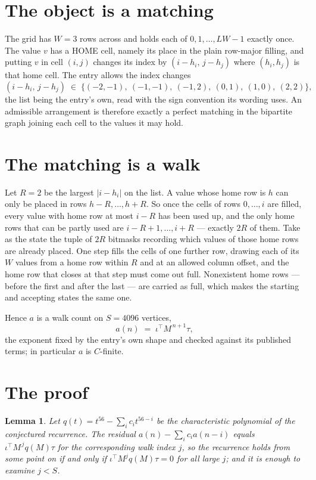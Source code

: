 \documentclass[11pt,a4paper]{article}
\theoremstyle{plain}
\newtheorem{lemma}[theorem]{Lemma}
\theoremstyle{definition}
\begin{document}
\section{The object is a matching}

The grid has $W=3$ rows across and holds each of $0,1,\dots,LW-1$ exactly once. The value
$v$ has a HOME cell, namely its place in the plain row-major filling, and putting $v$ in cell
$(i,j)$ changes its index by $(i-h_i,\,j-h_j)$ where $(h_i,h_j)$ is that home cell. The entry
allows the index changes
\[
(i-h_i,\,j-h_j)\;\in\;\{(-2,-1),\ (-1,-1),\ (-1,2),\ (0,1),\ (1,0),\ (2,2)\},
\]
the list being the entry's own, read with the sign convention its wording uses. An admissible
arrangement is therefore exactly a perfect matching in the bipartite graph joining each cell to
the values it may hold.

\section{The matching is a walk}

Let $R=2$ be the largest $|i-h_i|$ on the list. A value whose home row is $h$ can only be
placed in rows $h-R,\dots,h+R$. So once the cells of rows $0,\dots,i$ are filled, every
value with home row at most $i-R$ has been used up, and the only home rows that can be
partly used are $i-R+1,\dots,i+R$ --- exactly $2R$ of them. Take as the state the tuple of
$2R$ bitmasks recording which values of those home rows are already placed. One step fills
the cells of one further row, drawing each of its $W$ values from a home row within $R$
and at an allowed column offset, and the home row that closes at that step must come out
full. Nonexistent home rows --- before the first and after the last --- are carried as
full, which makes the starting and accepting states the same one.

Hence $a$ is a walk count on $S=4096$ vertices,
\[
a(n)\;=\;\iota^{\!\top}M^{\,n+1}\tau ,
\]
the exponent fixed by the entry's own shape and checked against its published terms; in
particular $a$ is $C$-finite.

\section{The proof}

\begin{lemma}\label{lem:crit}
Let $q(t)=t^{56}-\sum_i c_it^{56-i}$ be the characteristic polynomial of the
conjectured recurrence. The residual $a(n)-\sum_ic_ia(n-i)$ equals
$\iota^{\!\top}M^{\,j}q(M)\tau$ for the corresponding walk index $j$, so the recurrence
holds from some point on if and only if $\iota^{\!\top}M^{j}q(M)\tau=0$ for all large $j$;
and it is enough to examine $j<S$.
\end{lemma}
\end{document}
